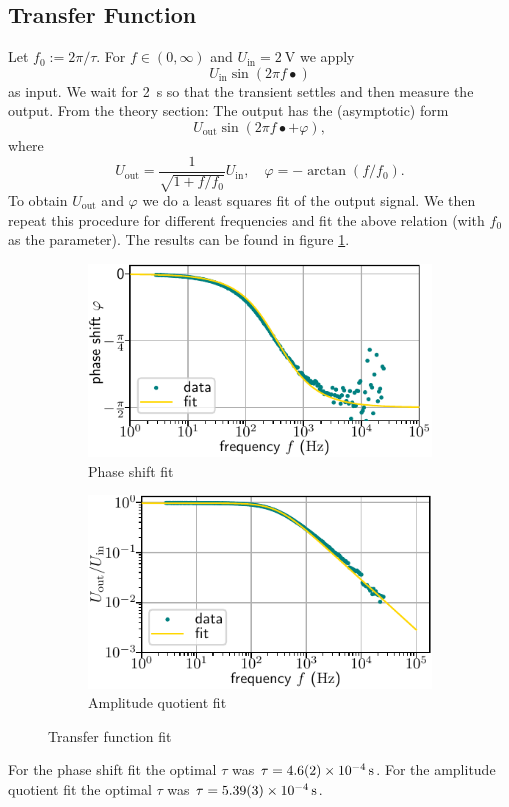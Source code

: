 \documentclass[10pt, a4paper]{article} %
\begin{document}
\subsection{Transfer Function}
Let $f_0 := 2\pi /\tau$.
For $f \in (0, \infty)$ and $U_\mathrm{in} =\SI{2}{\volt}$ we apply
\begin{equation*}
	U_\mathrm{in} \sin ( 2\pi f \bullet)
\end{equation*}
as input.
We wait for \SI{2}{\second} so that the transient settles and then measure the output.
From the theory section: The output has the (asymptotic) form
\begin{equation*}
	U_\mathrm{out} \sin (2 \pi f \bullet + \varphi),
\end{equation*}
where 
\begin{equation*}
	U_\mathrm{out} = \frac{1}{\sqrt{1+ f/f_0}} U_\mathrm{in}, \quad \varphi = - \arctan ( f /f_0).
\end{equation*}
To obtain $U_\mathrm{out}$ and $\varphi$ we do a least squares fit of the output signal.
We then repeat this procedure for different frequencies and fit the above relation (with $f_0$ as the parameter). The results can be found in figure \ref{fig:tf}.
  \begin{figure}
     \centering
     \begin{subfigure}{0.495\textwidth}
	     \includegraphics[width=\textwidth]{shifts.pdf}
         \caption{Phase shift fit}
     \end{subfigure}
	  \begin{subfigure}{0.495\textwidth}
	     \includegraphics[width=\textwidth]{quots.pdf}
         \caption{Amplitude quotient fit}
     \end{subfigure}
	  \caption{Transfer function fit}
        \label{fig:tf}
\end{figure}
For the phase shift fit the optimal $\tau$ was $\tau = \SI{4.6 \pm 0.2 e-4}{\second}$.
For the amplitude quotient fit the optimal $\tau$ was $\tau = \SI{5.39 \pm 0.03 e-4}{\second}$.
\end{document}
